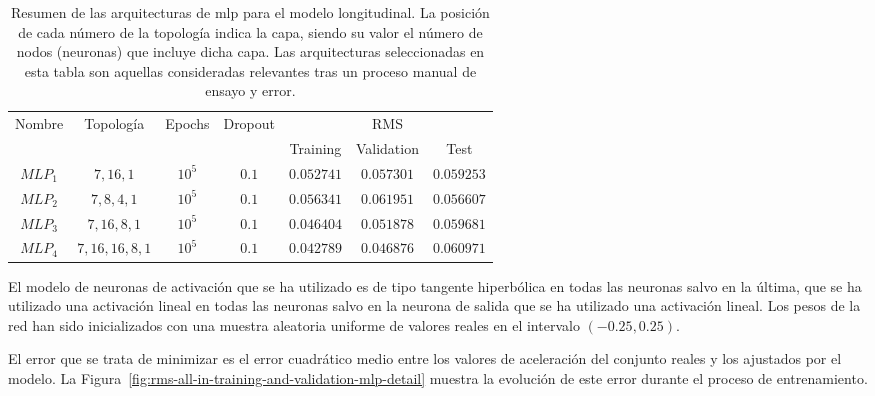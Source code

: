 \begin{table*}
	\caption[Resumen de las arquitecturas \ac{mlp} para el modelo longitudinal]{Resumen de las arquitecturas de \ac{mlp} para el modelo longitudinal. La posición de cada número de la topología indica la capa, siendo su valor el número de nodos (neuronas) que incluye dicha capa. Las arquitecturas seleccionadas en esta tabla son aquellas consideradas relevantes tras un proceso manual de ensayo y error.}
	\label{tbl:cf-mlp-architectures}
	\begin{tabular}{ccccccc}
		\hline
		\multirow{2}{*}{Nombre} & \multirow{2}{*}{Topología} & \multirow{2}{*}{Epochs} & \multirow{2}{*}{Dropout} & \multicolumn{3}{c}{RMS}      \\ \cline{5-7} 
		&                            &                         &                          & Training & Validation & Test \\ \hline
		$MLP_1$ & $7, 16, 1$                 & $10^5$                  & $0.1$                    & $0.052741$      & $0.057301$        & $0.059253$  \\
		$MLP_2$ & $7, 8, 4, 1$               & $10^5$                  & $0.1$                    & $0.056341$      & $0.061951$        & $0.056607$  \\
		$MLP_3$ & $7, 16, 8, 1$              & $10^5$                  & $0.1$                    & $0.046404$      & $0.051878$        & $0.059681$  \\
		$MLP_4$ & $7, 16, 16, 8, 1$          & $10^5$                  & $0.1$                    & $0.042789$      & $0.046876$        & $0.060971$  \\ \hline
	\end{tabular}
\end{table*}

El modelo de neuronas de activación que se ha utilizado es de tipo tangente hiperbólica en todas las neuronas salvo en la última, que se ha utilizado una activación lineal en todas las neuronas salvo en la neurona de salida que se ha utilizado una activación lineal. Los pesos de la red han sido inicializados con una muestra aleatoria uniforme de valores reales en el intervalo $(-0.25, 0.25)$.

El error que se trata de minimizar es el error cuadrático medio entre los valores de aceleración del conjunto reales y los ajustados por el modelo. La Figura~\ref{fig:rms-all-in-training-and-validation-mlp-detail} muestra la evolución de este error durante el proceso de entrenamiento.

